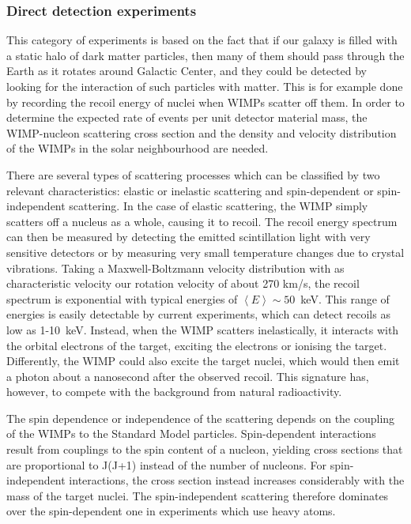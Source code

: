 \subsubsection{Direct detection experiments}

This category of experiments is based on the fact that if our galaxy is filled with a static halo of dark matter particles, then many of them should pass through the Earth as it rotates around Galactic Center, and they could be detected by looking for the interaction of such particles with matter. This is for example done by recording the recoil energy of nuclei when \acp{WIMP} scatter off them. In order to determine the expected rate of events per unit detector material mass, the \ac{WIMP}-nucleon scattering cross section and the density and velocity distribution of the \acp{WIMP} in the solar neighbourhood are needed.

There are several types of scattering processes which can be classified by two relevant characteristics: elastic or inelastic scattering and spin-dependent or spin-independent scattering. In the case of elastic scattering, the \ac{WIMP} simply scatters off a nucleus as a whole, causing it to recoil. The recoil energy spectrum can then be measured by detecting the emitted scintillation light with very sensitive detectors or by measuring very small temperature changes due to crystal vibrations. Taking a Maxwell-Boltzmann velocity distribution with as characteristic velocity our rotation velocity of about 270 km/s, the recoil spectrum is exponential with typical energies of $\left\langle E \right\rangle \sim 50$~keV. This range of energies is easily detectable by current experiments, which can detect recoils as low as 1-10~keV. Instead, when the \ac{WIMP} scatters inelastically, it interacts with the orbital electrons of the target, exciting the electrons or ionising the target. Differently, the \ac{WIMP} could also excite the target nuclei, which would then emit a photon about a nanosecond after the observed recoil. This signature has, however, to compete with the background from natural radioactivity.

The spin dependence or independence of the scattering depends on the coupling of the \acp{WIMP} to the Standard Model particles. Spin-dependent interactions result from couplings to the spin content of a nucleon, yielding cross sections that are proportional to J(J+1) instead of the number of nucleons. For spin-independent interactions, the cross section instead increases considerably with the mass of the target nuclei. The spin-independent scattering therefore dominates over the spin-dependent one in experiments which use heavy atoms.

